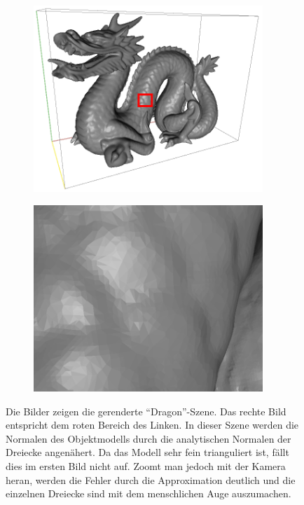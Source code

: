 		\begin{figure}
			\begin{subfigure}[b]{0.5\textwidth}
				\center
				\includegraphics[width=0.95\textwidth]{pic/normal_facette-mark.png}
			\end{subfigure}
			\begin{subfigure}[b]{0.5\textwidth}
				\center
				\includegraphics[width=0.95\textwidth]{pic/normal_facette-zoom.png}
			\end{subfigure}
			\caption[Facetten-Muster der \enquote{Dragon}-Szene ohne Shading-Normale]{Die Bilder zeigen die gerenderte \enquote{Dragon}-Szene. Das rechte Bild entspricht dem roten Bereich des Linken. In dieser Szene werden die Normalen des Objektmodells durch die analytischen Normalen der Dreiecke angenähert. Da das Modell sehr fein trianguliert ist, fällt dies im ersten Bild nicht auf. Zoomt man jedoch mit der Kamera heran, werden die Fehler durch die Approximation deutlich und die einzelnen Dreiecke sind mit dem menschlichen Auge auszumachen.}
			\label{fig:facette}
		\end{figure}

